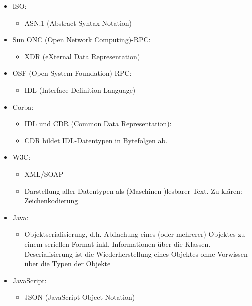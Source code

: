 \begin{itemize}
    \item ISO:
    \begin{itemize}
        \item ASN.1 (Abstract Syntax Notation)
    \end{itemize}
    \item Sun ONC (Open Network Computing)-RPC:
    \begin{itemize}
        \item XDR (eXternal Data Representation)
    \end{itemize}
    \item OSF (Open System Foundation)-RPC:
    \begin{itemize}
        \item IDL (Interface Definition Language)
    \end{itemize}
    \item Corba:
    \begin{itemize}
        \item IDL und CDR (Common Data Representation):
        \item CDR bildet IDL-Datentypen in Bytefolgen ab.
    \end{itemize}
    \item W3C:
    \begin{itemize}
        \item XML/SOAP
        \item Darstellung aller Datentypen als (Maschinen-)lesbarer Text.
        Zu klären: Zeichenkodierung
    \end{itemize}
    \item Java:
    \begin{itemize}
        \item Objektserialisierung, d.h. Abflachung eines (oder mehrerer) Objektes zu einem seriellen Format inkl. Informationen über die Klassen.
        Deserialisierung ist die Wiederherstellung eines Objektes ohne Vorwissen über die Typen der Objekte
    \end{itemize}
    \item JavaScript:
    \begin{itemize}
        \item JSON (JavaScript Object Notation)
    \end{itemize}
\end{itemize}

